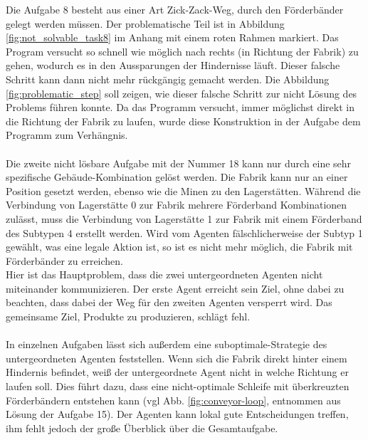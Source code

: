 Die Aufgabe 8 besteht aus einer Art Zick-Zack-Weg, durch den Förderbänder gelegt werden müssen. Der problematische Teil ist in Abbildung \ref{fig:not_solvable_task8} im Anhang mit einem roten Rahmen markiert. Das Program versucht so schnell wie möglich nach rechts (in Richtung der Fabrik) zu gehen, wodurch es in den Aussparungen der Hindernisse läuft. Dieser falsche Schritt kann dann nicht mehr rückgängig gemacht werden. Die Abbildung \ref{fig:problematic_step} soll zeigen, wie dieser falsche Schritt zur nicht Lösung des Problems führen konnte.
Da das Programm versucht, immer möglichst direkt in die Richtung der Fabrik zu laufen, wurde diese Konstruktion in der Aufgabe dem Programm zum Verhängnis.
\\\\
Die zweite nicht lösbare Aufgabe mit der Nummer 18 kann nur durch eine sehr spezifische Gebäude-Kombination gelöst werden. Die Fabrik kann nur an einer Position gesetzt werden, ebenso wie die Minen zu den Lagerstätten. Während die Verbindung von Lagerstätte 0 zur Fabrik mehrere Förderband Kombinationen zulässt, muss die Verbindung von Lagerstätte 1 zur Fabrik mit einem Förderband des Subtypen 4 erstellt werden. Wird vom Agenten fälschlicherweise der Subtyp 1 gewählt, was eine legale Aktion ist, so ist es nicht mehr möglich, die Fabrik mit Förderbänder zu erreichen. \\
Hier ist das Hauptproblem, dass die zwei untergeordneten Agenten nicht miteinander kommunizieren. Der erste Agent erreicht sein Ziel, ohne dabei zu beachten, dass dabei der Weg für den zweiten Agenten versperrt wird. Das gemeinsame Ziel, Produkte zu produzieren, schlägt fehl. 
\\\\
In einzelnen Aufgaben lässt sich außerdem eine suboptimale-Strategie des untergeordneten Agenten feststellen. 
Wenn sich die Fabrik direkt hinter einem Hindernis befindet, weiß der untergeordnete Agent nicht in welche Richtung er laufen soll. Dies führt dazu, dass eine nicht-optimale Schleife mit überkreuzten Förderbändern entstehen kann (vgl Abb. \ref{fig:conveyor-loop}, entnommen aus Lösung der Aufgabe 15). Der Agenten kann lokal gute Entscheidungen treffen, ihm fehlt jedoch der große Überblick über die Gesamtaufgabe.

